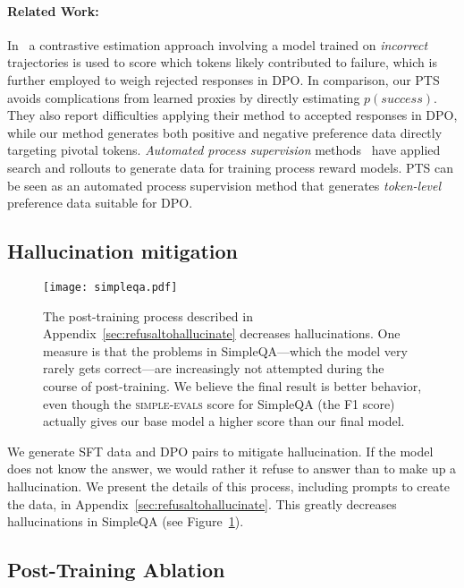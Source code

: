 \paragraph{Related Work:} In~\cite{lin2024criticaltokensmattertokenlevel} a contrastive estimation approach involving a model trained on \emph{incorrect} trajectories is used to score which tokens likely contributed to failure, which is further employed to weigh rejected responses in DPO. In comparison, our PTS avoids complications from learned proxies by directly estimating $p(success)$. They also report difficulties applying their method to accepted responses in DPO, while our method generates both positive and negative preference data directly targeting pivotal tokens. \emph{Automated process supervision} methods~\cite{wang2024mathshepherdverifyreinforcellms,luo2024improvemathematicalreasoninglanguage} have applied search and rollouts to generate data for training process reward models. PTS can be seen as an automated process supervision method that generates \emph{token-level} preference data suitable for DPO.

\subsection{Hallucination mitigation}

\begin{figure}[t]
    \centering \texttt{[image: simpleqa.pdf]}
    \caption{The post-training process described in Appendix~\ref{sec:refusaltohallucinate} decreases hallucinations.  One measure is that the problems in SimpleQA---which the model very rarely gets correct---are increasingly not attempted during the course of post-training.  We believe the final result is better behavior, even though the \textsc{simple-evals} score for SimpleQA (the F1 score) actually gives our base model a higher score than our final model. }\label{fig:simpleQA}
\end{figure}

We generate SFT data and DPO pairs to mitigate hallucination.  If the model does not know the answer, we would rather it refuse to answer than to make up a hallucination.  We present the details of this process, including prompts to create the data, in Appendix~\ref{sec:refusaltohallucinate}.  This greatly decreases hallucinations in SimpleQA (see Figure~\ref{fig:simpleQA}).

\subsection{Post-Training Ablation}

